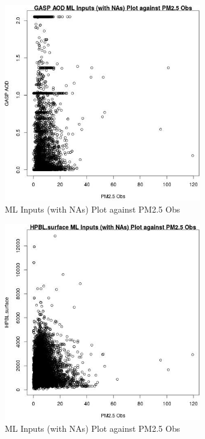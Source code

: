 \begin{figure} 
\centering  
\includegraphics[width=0.77\textwidth]{Code_Outputs/Report_ML_input_PM25_Step4_part_e_de_duplicated_aves_compiled_2019-05-18wNAs_GASP_AODvPM25_Obs.jpg} 
\caption{\label{fig:Report_ML_input_PM25_Step4_part_e_de_duplicated_aves_compiled_2019-05-18wNAsGASP_AODvPM25_Obs}ML Inputs (with NAs) Plot against PM2.5 Obs} 
\end{figure} 
 

\begin{figure} 
\centering  
\includegraphics[width=0.77\textwidth]{Code_Outputs/Report_ML_input_PM25_Step4_part_e_de_duplicated_aves_compiled_2019-05-18wNAs_HPBLsurfacevPM25_Obs.jpg} 
\caption{\label{fig:Report_ML_input_PM25_Step4_part_e_de_duplicated_aves_compiled_2019-05-18wNAsHPBLsurfacevPM25_Obs}ML Inputs (with NAs) Plot against PM2.5 Obs} 
\end{figure} 
 

